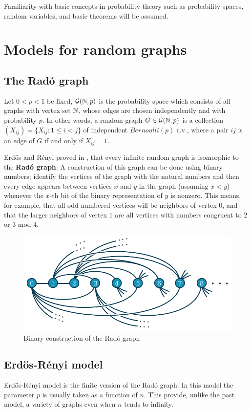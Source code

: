 Familiarity with basic concepts in probability theory such as probability spaces, random variables, and basic theorems will be assumed.

\section{Models for random graphs}

\subsection{The Radó graph}
Let $0 < p < 1$ be fixed, $\mathcal{G}(\mathbb{N}, p)$ is the probability space which consists of all graphs with vertex set $\mathbb{N}$, whose edges are chosen independently and with probability $p$. In other words, a random graph $G \in \mathcal{G}(\mathbb{N},p)$ is a collection $(X_{ij}) = \{ X_{ij} : 1 \leq i < j\}$ of independent $Bernoulli(p)$ r.v., where a pair $ij$ is an edge of $G$ if and only if $X_{ij} = 1$.

Erdös and Rényi proved in \cite[Erdös, Rényi]{RadoUnique}, that every infinite random graph is isomorphic to the \textbf{Radó graph}. A construction of this graph can be done using binary numbers; identify the vertices of the graph with the natural numbers and then every edge appears between vertices $x$ and $y$ in the graph (assuming $x < y$) whenever the $x$-th bit of the binary representation of $y$ is nonzero. This means, for example, that all odd-numbered vertices will be neighbors of vertex $0$, and that the larger neighbors of vertex $1$ are all vertices with numbers congruent to $2$ or $3$ mod $4$.

\begin{figure}[h!]
	\centering
	\includegraphics[scale=0.7]{Figures/Rado-graph.png}
	\caption{Binary construction of the Radó graph}
\end{figure}

\subsection{Erdös-Rényi model}
Erdös-Rényi model is the finite version of the Radó graph. In this model the parameter $p$ is usually taken as a function of $n$. This provide, unlike the past model, a variety of graphs even when $n$ tends to infinity.

